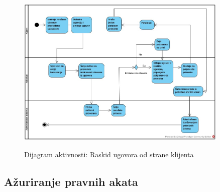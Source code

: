 \documentclass[20pt]{article}
\begin{document}
\begin{figure}[h]
		\centering
		\includegraphics[width=0.9\textwidth,height=0.74\textheight]{Pictures/raskidUgovoraOdStraneKlijenta}\\
		\caption{Dijagram aktivnosti: Raskid ugovora od strane klijenta}
		\label{fig:dijagramAktivnostiRaskidUgovoraOdKlijenta}
	\end{figure}

\newpage
\subsection{\bfseries \Large A\v {z}uriranje pravnih akata}
\setlength{\parindent}{1cm}
\fontsize{13}{18} \selectfont 
\end{document}
